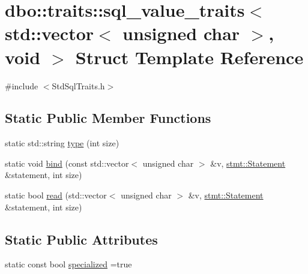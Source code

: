\hypertarget{structdbo_1_1traits_1_1sql__value__traits_3_01std_1_1vector_3_01unsigned_01char_01_4_00_01void_01_4}{\section{dbo\+:\+:traits\+:\+:sql\+\_\+value\+\_\+traits$<$ std\+:\+:vector$<$ unsigned char $>$, void $>$ Struct Template Reference}
\label{structdbo_1_1traits_1_1sql__value__traits_3_01std_1_1vector_3_01unsigned_01char_01_4_00_01void_01_4}
}


{\ttfamily \#include $<$Std\+Sql\+Traits.\+h$>$}

\subsection*{Static Public Member Functions}
\begin{DoxyCompactItemize}
\item 
static std\+::string \hyperlink{structdbo_1_1traits_1_1sql__value__traits_3_01std_1_1vector_3_01unsigned_01char_01_4_00_01void_01_4_a720b688481685a27d6552469c985fcc1}{type} (int size)
\item 
static void \hyperlink{structdbo_1_1traits_1_1sql__value__traits_3_01std_1_1vector_3_01unsigned_01char_01_4_00_01void_01_4_ae661af7e0a1cbb9f48eca2f8accb451c}{bind} (const std\+::vector$<$ unsigned char $>$ \&v, \hyperlink{classdbo_1_1stmt_1_1_statement}{stmt\+::\+Statement} \&statement, int size)
\item 
static bool \hyperlink{structdbo_1_1traits_1_1sql__value__traits_3_01std_1_1vector_3_01unsigned_01char_01_4_00_01void_01_4_ab37380f9c4ff2e7daf37f9355f12baf4}{read} (std\+::vector$<$ unsigned char $>$ \&v, \hyperlink{classdbo_1_1stmt_1_1_statement}{stmt\+::\+Statement} \&statement, int size)
\end{DoxyCompactItemize}
\subsection*{Static Public Attributes}
\begin{DoxyCompactItemize}
\item 
static const bool \hyperlink{structdbo_1_1traits_1_1sql__value__traits_3_01std_1_1vector_3_01unsigned_01char_01_4_00_01void_01_4_a905aa3f56e17a72e7a653cfc1781cb14}{specialized} =true
\end{DoxyCompactItemize}


